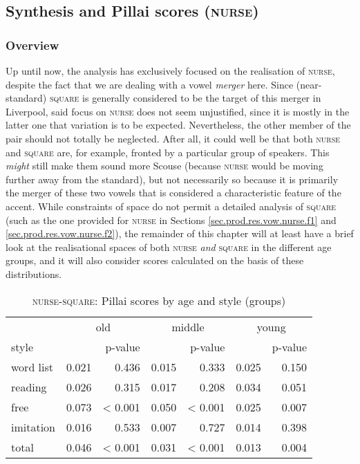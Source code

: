 \subsection{Synthesis and Pillai scores (\textrm{\textsc{nurse}})}
\label{sec.prod.res.vow.nurse.pil}

\subsubsection{Overview}
Up until now, the analysis has exclusively focused on the realisation of \textsc{nurse}, despite the fact that we are dealing with a vowel \emph{merger} here.
Since (near-standard) \textsc{square} is generally considered to be the target of this merger in Liverpool, said focus on \textsc{nurse} does not seem unjustified, since it is mostly in the latter one that variation is to be expected.
Nevertheless, the other member of the pair should not totally be neglected.
After all, it could well be that both \textsc{nurse} and \textsc{square} are, for example, fronted by a particular group of speakers.
This \emph{might} still make them sound more Scouse (because \textsc{nurse} would be moving further away from the standard), but not necessarily so because it is primarily the merger of these two vowels that is considered a characteristic feature of the accent.
While constraints of space do not permit a detailed analysis of \textsc{square} (such as the one provided for \textsc{nurse} in Sections \ref{sec.prod.res.vow.nurse.f1} and \ref{sec.prod.res.vow.nurse.f2}), the remainder of this chapter will at least have a brief look at the realisational spaces of both \textsc{nurse} \emph{and} \textsc{square} in the different age groups, and it will also consider  scores calculated on the basis of these distributions.

\begin{table}[h!]
	\centering
	\caption{\textsc{nurse}-\textsc{square}: Pillai scores by age and style (groups)}
	\label{tab.pillai.nurse.agestyle}
	\begin{tabular}{lrrrrrr}
		\hline
		& \multicolumn{2}{c}{old} & \multicolumn{2}{c}{middle} & \multicolumn{2}{c}{young}\\
		style & \isi{Pillai} & p-value & \isi{Pillai} & p-value & \isi{Pillai} & p-value\\
		\hline
		word list & 0.021 & 0.436 & 0.015 & 0.333 & 0.025 & 0.150\\
		reading & 0.026 & 0.315 & 0.017 & 0.208 & 0.034 & 0.051\\
		free & 0.073 & < 0.001 & 0.050 & < 0.001 & 0.025 & 0.007\\
		imitation\is{accent performance} & 0.016 & 0.533 & 0.007 & 0.727 & 0.014 & 0.398\\
		total & 0.046 & < 0.001 & 0.031 & < 0.001 & 0.013 & 0.004\\
		\hline
	\end{tabular}
\end{table}

